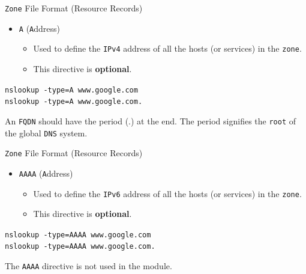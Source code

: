 \documentclass[xcolor=table]{beamer}
\begin{document}
\begin{frame}{\texttt{Zone} File Format (Resource Records)}
  \begin{itemize}
    \item \texttt{A} (\texttt{A}ddress)
       \begin{itemize}
          \item Used to define the \texttt{IPv4} address of all the hosts (or services) in the \texttt{zone}.
          \item This directive is \textbf{optional}.
       \end{itemize}
  \end{itemize}
  \begin{tcolorbox}
    \begin{center}
      \texttt{nslookup -type=A www.google.com}\\
      \texttt{nslookup -type=A www.google.com.}
    \end{center}
  \end{tcolorbox}
  \begin{tcolorbox}[title={\textbf{NOTE:}}]
      An \texttt{FQDN} should have the period (.) at the end. The period signifies the \texttt{root} of the global \texttt{DNS} system.
  \end{tcolorbox}
\end{frame}

\begin{frame}{\texttt{Zone} File Format (Resource Records)}
  \begin{itemize}
    \item \texttt{AAAA} (\texttt{A}ddress)
       \begin{itemize}
          \item Used to define the \texttt{IPv6} address of all the hosts (or services) in the \texttt{zone}.
          \item This directive is \textbf{optional}.
       \end{itemize}
  \end{itemize}
  \begin{tcolorbox}
    \begin{center}
      \texttt{nslookup -type=AAAA www.google.com}\\
      \texttt{nslookup -type=AAAA www.google.com.}
    \end{center}
  \end{tcolorbox}
  \begin{tcolorbox}[title={\textbf{NOTE:}}]
      The \texttt{AAAA} directive is not used in the module.
  \end{tcolorbox}
\end{frame}
\end{document}
